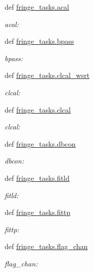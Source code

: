\begin{DoxyCompactItemize}
\item 
def \hyperlink{namespacefringe__tasks_a94107aea8ed98e8513f3f8322ab69290}{fringe\-\_\-tasks.\-acal}
\begin{DoxyCompactList}\small\item\em acal\-: \end{DoxyCompactList}\item 
def \hyperlink{namespacefringe__tasks_acd9f970ff29e8fc8e7812df015cf8f70}{fringe\-\_\-tasks.\-bpass}
\begin{DoxyCompactList}\small\item\em bpass\-: \end{DoxyCompactList}\item 
def \hyperlink{namespacefringe__tasks_a0c0f27cecfbb00ae771d59e1c0d3b66b}{fringe\-\_\-tasks.\-clcal\-\_\-wsrt}
\begin{DoxyCompactList}\small\item\em clcal\-: \end{DoxyCompactList}\item 
def \hyperlink{namespacefringe__tasks_afff8513a11a6ac2cb0db0326d30e58af}{fringe\-\_\-tasks.\-clcal}
\begin{DoxyCompactList}\small\item\em clcal\-: \end{DoxyCompactList}\item 
def \hyperlink{namespacefringe__tasks_ad81e5a1bef709330e27c911c2ab3e920}{fringe\-\_\-tasks.\-dbcon}
\begin{DoxyCompactList}\small\item\em dbcon\-: \end{DoxyCompactList}\item 
def \hyperlink{namespacefringe__tasks_a1d1097db6bfb00a9a97f105029b3217a}{fringe\-\_\-tasks.\-fitld}
\begin{DoxyCompactList}\small\item\em fitld\-: \end{DoxyCompactList}\item 
def \hyperlink{namespacefringe__tasks_ac00af45437f25f6b7e0df89a1276c72d}{fringe\-\_\-tasks.\-fittp}
\begin{DoxyCompactList}\small\item\em fittp\-: \end{DoxyCompactList}\item 
def \hyperlink{namespacefringe__tasks_a81e3e38505a3b24916e2db5c971e0412}{fringe\-\_\-tasks.\-flag\-\_\-chan}
\begin{DoxyCompactList}\small\item\em flag\-\_\-chan\-: \end{DoxyCompactList}\item 

\end{DoxyCompactItemize}
